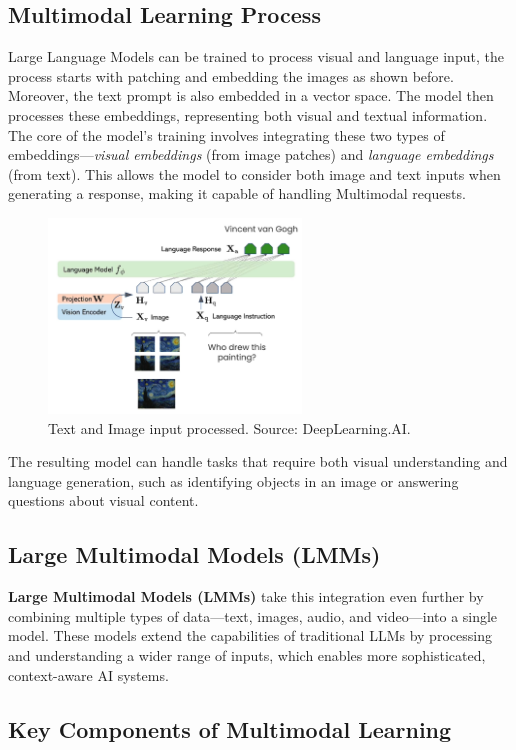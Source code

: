 \subsection{Multimodal Learning Process}
Large Language Models can be trained to process visual and language input, the process starts with patching and embedding the images as shown before. Moreover, the text prompt is also embedded in a vector space. The model then processes these embeddings, representing both visual and textual information. The core of the model’s training involves integrating these two types of embeddings—\textit{visual embeddings} (from image patches) and \textit{language embeddings} (from text). This allows the model to consider both image and text inputs when generating a response, making it capable of handling Multimodal requests.
\begin{figure}[h]
    \centering
    \includegraphics[width=0.6\textwidth]{IMAGES/immagine_2025-02-26_113532424.png}
    \caption{Text and Image input processed. Source: DeepLearning.AI.\footnotemark[4]}
    \label{fig:InputText}
\end{figure}
The resulting model can handle tasks that require both visual understanding and language generation, such as identifying objects in an image or answering questions about visual content.

\subsection{Large Multimodal Models (LMMs)}
\textbf{Large Multimodal Models (LMMs)} take this integration even further by combining multiple types of data—text, images, audio, and video—into a single model. These models extend the capabilities of traditional LLMs by processing and understanding a wider range of inputs, which enables more sophisticated, context-aware AI systems.

\subsection{Key Components of Multimodal Learning}


